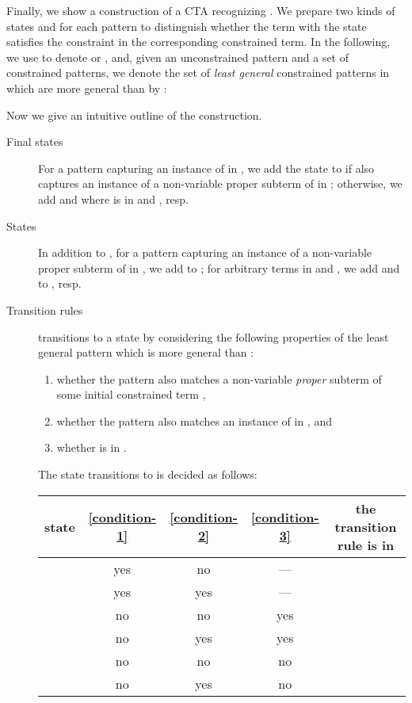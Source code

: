 \documentclass[copyright,creativecommons]{eptcs}
\begin{document}
Finally, we show a construction of a CTA recognizing .
We prepare two kinds of states  and 
for each pattern to distinguish whether the term with the state
satisfies the constraint in the corresponding constrained term.
In the following, we use  to denote  or , and,
given an unconstrained pattern  and a set  of constrained
patterns, we denote the set of \emph{least general} constrained patterns
in  which are more general than  by :

Now we give an intuitive outline of the construction.
\begin{description}
 \item[Final states]
	    For a pattern  capturing an instance of 
	    in ,
	    we add the state  to  if  also captures
	    an instance of a non-variable proper subterm of
	     in ;
	    otherwise, we add  and
	     where  is in
	     and
	    , resp.
 \item[States]
	    In addition to , for a pattern  capturing an
	    instance of a non-variable proper subterm of
	     in , we add  to ;
	    for arbitrary terms in  and
	    , we add  and
	     to , resp.
 \item[Transition rules]
	     transitions to 
	    a state by considering the following properties of the least
	    general pattern  which is more general than
	    : 
	    \begin{enumerate}
	     \renewcommand{\labelenumi}{(\alph{enumi})}
	     \renewcommand{\theenumi}{(\alph{enumi})}
	     \item\label{condition-1}
		  whether the pattern  also matches a non-variable
		  \emph{proper} subterm of some initial constrained term 
		    ,
	     \item\label{condition-2}
		  whether the pattern  also matches an instance of
		   in , and
	     \item\label{condition-3} 
		  whether  is in . 
	    \end{enumerate}
	    The state 
	    transitions to is decided as follows:
	    \begin{center}
	     \begin{tabular}{c|ccc|c}
	      state
	      & \ref{condition-1} 
	      & \ref{condition-2} 
	      & \ref{condition-3}
	      & the transition rule is in \\
	      \hline
 & yes & no & --- &  \\
 & yes & yes & --- &  \\
 & no & no & yes &  \\
 & no & yes & yes &
	       \\
 & no & no & no &  \\
 & no & yes & no &
	       \\
	     \end{tabular}
	    \end{center}
\end{description}
\end{document}
